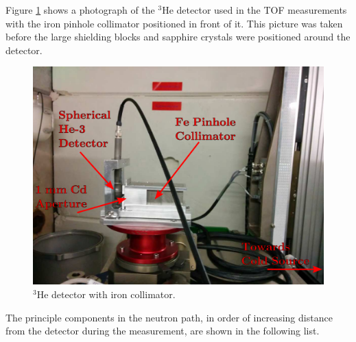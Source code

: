 \documentclass[5p,12pt]{elsarticle}
\begin{document}
Figure \ref{fig:det} shows a photograph of the $^3$He detector used in the TOF measurements with the iron pinhole collimator positioned in front of it.   This picture was taken before the large shielding blocks and sapphire crystals were positioned around the detector.

\begin{figure}[h!] 
  \centering
    \includegraphics[width=\columnwidth]{graphics/det.eps}
     \caption{$^3$He detector with iron collimator. \label{fig:det}}
\end{figure}

The principle components in the neutron path, in order of increasing distance from the detector during the measurement, are shown in the following list.
\end{document}
